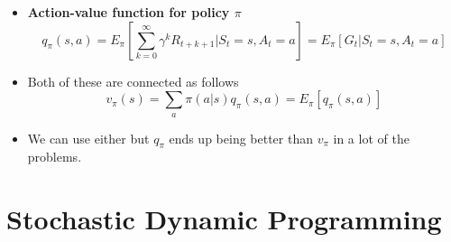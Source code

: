 \documentclass[a4paper]{article}
\begin{document}
\begin{itemize}
\begin{equation*}
    \end{equation*}
    \item \textbf{Action-value function for policy $\pi$}
    \begin{equation*}
        q_\pi(s,a)=E_\pi[\sum_{k=0}^\infty \gamma^kR_{t+k+1}|S_t=s,A_t=a]=E_\pi[G_t|S_t=s,A_t=a]
    \end{equation*}
    \item Both of these are connected as follows
    \begin{equation*}
        v_\pi(s)=\sum_a\pi(a|s)q_\pi(s,a)=E_\pi[q_\pi(s,a)]
    \end{equation*}
    \item We can use either but $q_\pi$ ends up being better than $v_\pi$ in a lot of the problems.
\end{itemize}

\section{Stochastic Dynamic Programming}
\end{document}
